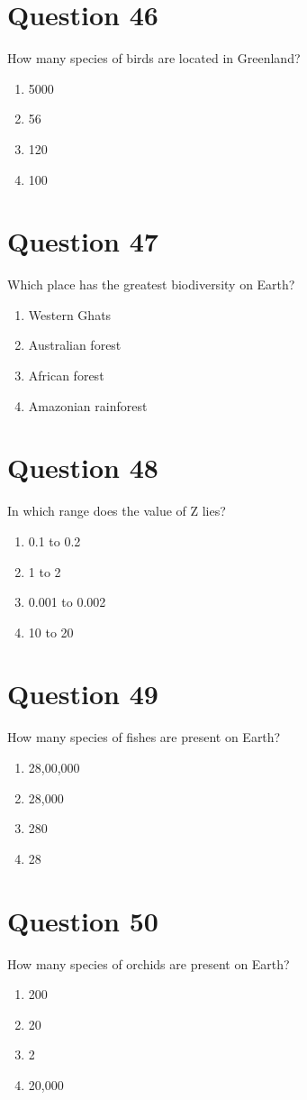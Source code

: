 \documentclass{article}
\begin{document}
\section*{Question 46}
How many species of birds are located in Greenland?\newline
\begin{enumerate}[label=(\alph*)]
\item 5000
\item 56
\item 120
\item 100
\end{enumerate}
\newpage
\section*{Question 47}
Which place has the greatest biodiversity on Earth?\newline
\begin{enumerate}[label=(\alph*)]
\item Western Ghats
\item Australian forest
\item African forest
\item Amazonian rainforest
\end{enumerate}
\newpage
\section*{Question 48}
In which range does the value of Z lies?
\begin{enumerate}[label=(\alph*)]
\item 0.1 to 0.2
\item 1 to 2
\item 0.001 to 0.002
\item 10 to 20
\end{enumerate}
\newpage
\section*{Question 49}
How many species of fishes are present on Earth?\newline
\begin{enumerate}[label=(\alph*)]
\item 28,00,000
\item 28,000
\item 280
\item 28
\end{enumerate}
\newpage
\section*{Question 50}
How many species of orchids are present on Earth?
\begin{enumerate}[label=(\alph*)]
\item 200
\item 20
\item 2
\item 20,000
\end{enumerate}
\newpage
\end{document}
